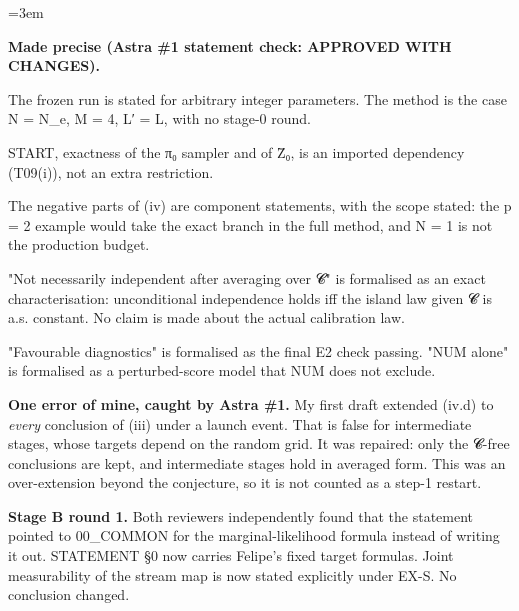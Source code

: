 \documentclass[11pt]{report}
\newcommand{\mdlbl}[1]{\textup{#1}}
\newenvironment{mdblock}{\begingroup\mdfont\raggedright\setlength{\parindent}{0pt}\setlength{\parskip}{0.55em}\emergencystretch=3em}{\par\endgroup}
\newcommand{\mdhead}[2]{\par\vspace{0.7em}\noindent{\bfseries\ifcase#1\or\large\or\normalsize\or\normalsize\or\small\or\small\or\small\fi #2}\par\nopagebreak\vspace{0.1em}}
\begin{document}
\begin{mdblock}
\mdhead{2}{Statement changes, and why}

\begin{mdnum}
\item[\mdlbl{1.}] \textbf{Made precise (Astra \#1 statement check: APPROVED WITH CHANGES).}

\begin{mdbul}
\item The frozen run is stated for arbitrary integer parameters. The method is the case N = N\_e, M = 4, L′ = L, with no stage-0 round.
\item START, exactness of the π₀ sampler and of Z̄₀, is an imported dependency (T09(i)), not an extra restriction.
\item The negative parts of (iv) are component statements, with the scope stated: the p = 2 example would take the exact branch in the full method, and N = 1 is not the production budget.
\item "Not necessarily independent after averaging over 𝓒" is formalised as an exact characterisation: unconditional independence holds iff the island law given 𝓒 is a.s. constant. No claim is made about the actual calibration law.
\item "Favourable diagnostics" is formalised as the final E2 check passing. "NUM alone" is formalised as a perturbed-score model that NUM does not exclude.
\end{mdbul}
\item[\mdlbl{2.}] \textbf{One error of mine, caught by Astra \#1.} My first draft extended (iv.d) to \emph{every} conclusion of (iii) under a launch event. That is false for intermediate stages, whose targets depend on the random grid. It was repaired: only the 𝓒-free conclusions are kept, and intermediate stages hold in averaged form. This was an over-extension beyond the conjecture, so it is not counted as a step-1 restart.
\item[\mdlbl{3.}] \textbf{Stage B round 1.} Both reviewers independently found that the statement pointed to 00\_COMMON for the marginal-likelihood formula instead of writing it out. STATEMENT §0 now carries Felipe's fixed target formulas. Joint measurability of the stream map is now stated explicitly under EX-S. No conclusion changed.
\end{mdnum}
\end{mdblock}
\end{document}
